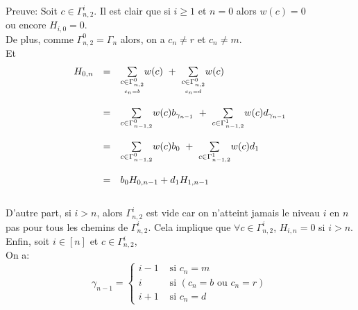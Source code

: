 Preuve:
Soit $c \in \Gamma_{n,2}^{i}$. Il est clair que si $i\geq 1$ et $n=0$ alors $w(c)=0$ \\ ou encore $H_{i, 0}=0$.\\
De plus, comme $\Gamma_{n, 2}^{0}=\Gamma_{n}$ alors, on a $c_{n}\neq r$ et $c_{n}\neq m$.\vspace{5pt}\\
Et
\[
	\begin{array}{l l l}
		H_{0, n} & =       & \underset{\underset{c_{n}=b}{c\in \Gamma_{n,2}^{0}}}{\sum}w(c)
		\text{ }+\text{ }\underset{\underset{c_{n}=d}{c\in \Gamma_{n,2}^{0}}}{\sum}
		w(c)                                                                                        \\
		         & \text{} &                                                                        \\
		         & =       & \underset{c\in \Gamma_{n-1,2}^{0}}{\sum}w(c)b_{\gamma_{n-1}} \text{ }+
		\text{ }\underset{c\in \Gamma_{n-1,2}^{1}}{\sum}w(c)d_{\gamma_{n-1}}                        \\
		         & \text{} &                                                                        \\
		         & =       & \underset{c\in \Gamma_{n-1,2}^{0}}{\sum}w(c)b_{0} \text{ }+\text{ }
		\underset{c\in \Gamma_{n-1,2}^{1}}{\sum}w(c)d_{1}                                           \\
		         & \text{} &                                                                        \\
		         & =       & b_{0}H_{0,n-1}+d_{1}H_{1,n-1}
	\end{array}
\]\\D'autre part, si $i>n$, alors $\Gamma_{n,2}^{i}$ est vide car on n'atteint jamais le niveau $i$ en $n$ pas pour tous les chemins de $\Gamma_{n,2}^{i}$. Cela implique que $\forall c \in \Gamma_{n,2}^{i}$, $H_{i,n}=0$ si $i>n$.\vspace{10pt}\\ Enfin, soit $i \in [n]$ et $c \in \Gamma_{n,2}^{i}$, \\
On a:
$$
	\gamma_{n-1} = \begin{cases}
		i-1 & \text{ si }c_{n}=m                       \\
		i   & \text{ si }(c_{n}=b \text{ ou } c_{n}=r) \\
		i+1 & \text{ si }c_{n}=d
	\end{cases}
$$\\
